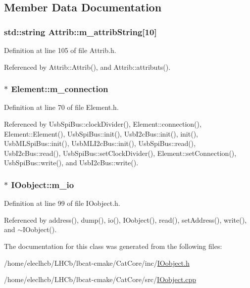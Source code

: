 \subsection{Member Data Documentation}
\hypertarget{classAttrib_a3414521d7a82476e874b25a5407b5e63}{
\subsubsection[{m\_\-attribString}]{\setlength{\rightskip}{0pt plus 5cm}std::string {\bf Attrib::m\_\-attribString}\mbox{[}10\mbox{]}}}
\label{classAttrib_a3414521d7a82476e874b25a5407b5e63}


Definition at line 105 of file Attrib.h.

Referenced by Attrib::Attrib(), and Attrib::attributs().\hypertarget{classElement_abe3de7a5dbbc9a6dd2d7e012e5fdb266}{
\subsubsection[{m\_\-connection}]{$\ast$ {\bf Element::m\_\-connection}}}
\label{classElement_abe3de7a5dbbc9a6dd2d7e012e5fdb266}


Definition at line 70 of file Element.h.

Referenced by UsbSpiBus::clockDivider(), Element::connection(), Element::Element(), UsbSpiBus::init(), UsbI2cBus::init(), init(), UsbMLSpiBus::init(), UsbMLI2cBus::init(), UsbSpiBus::read(), UsbI2cBus::read(), UsbSpiBus::setClockDivider(), Element::setConnection(), UsbSpiBus::write(), and UsbI2cBus::write().\hypertarget{classIOobject_aa648e4128c3c37d8291d6bb26b57c504}{
\subsubsection[{m\_\-io}]{$\ast$ {\bf IOobject::m\_\-io}}}
\label{classIOobject_aa648e4128c3c37d8291d6bb26b57c504}


Definition at line 99 of file IOobject.h.

Referenced by address(), dump(), io(), IOobject(), read(), setAddress(), write(), and $\sim$IOobject().

The documentation for this class was generated from the following files:\begin{DoxyCompactItemize}
\item 
/home/eleclhcb/LHCb/lbcat-\/cmake/CatCore/inc/\hyperlink{IOobject_8h}{IOobject.h}\item 
/home/eleclhcb/LHCb/lbcat-\/cmake/CatCore/src/\hyperlink{IOobject_8cpp}{IOobject.cpp}\end{DoxyCompactItemize}
